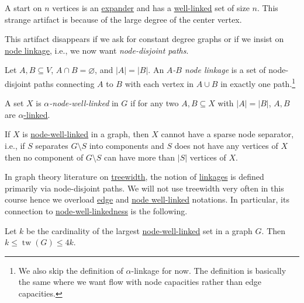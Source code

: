 \begin{eg}[Star]
	A start on \(n\) vertices is an \hyperref[def:expander]{expander} and has a \hyperref[def:well-linked]{well-linked} set of size \(n\). This strange artifact is because of the large degree of the center vertex.
\end{eg}

This artifact disappears if we ask for constant degree graphs or if we insist on \hyperref[def:node-linkage]{node linkage}, i.e., we now want \emph{node-disjoint paths}.

\begin{definition}\label{def:node-linkage}
	Let \(A, B \subseteq V\), \(A \cap B = \varnothing \), and \(\lvert A \rvert = \lvert B \rvert \). An \emph{\(A\)-\(B\) node linkage} is a set of node-disjoint paths connecting \(A\) to \(B\) with each vertex in \(A \cup B\) in exactly one path.\footnote{We also skip the definition of \(\alpha \)-linkage for now. The definition is basically the same where we want flow with node capacities rather than edge capacities.}
\end{definition}

\begin{definition}\label{def:node-well-linked}
	A set \(X\) is \emph{\(\alpha \)-node-well-linked} in \(G\) if for any two \(A, B \subseteq X\) with \(\lvert A \rvert = \lvert B \rvert \), \(A, B\) are \hyperref[def:node-linkage]{\(\alpha \)-linked}.
\end{definition}

\begin{intuition}
	If \(X\) is \hyperref[def:node-well-linked]{node-well-linked} in a graph, then \(X\) cannot have a sparse node separator, i.e., if \(S\) separates \(G\setminus S\)  	into components and \(S\) does not have any vertices of \(X\) then no component of \(G\setminus S\) can have more than \(\lvert S \rvert \) vertices of \(X\).
\end{intuition}

In graph theory literature on \href{https://en.wikipedia.org/wiki/Treewidth}{treewidth}, the notion of \hyperref[def:linkage]{linkages} is defined primarily via node-disjoint paths. We will not use treewidth very often in this course hence we overload \hyperref[def:linkage]{edge} and \hyperref[def:node-well-linked]{node well-linked} notations. In particular, its connection to \hyperref[def:node-well-linked]{node-well-linkedness} is the following.

\begin{theorem}
	Let \(k\) be the cardinality of the largest \hyperref[def:node-well-linked]{node-well-linked} set in a graph \(G\). Then \(k \leq \operatorname{tw}(G) \leq 4k\).
\end{theorem}

